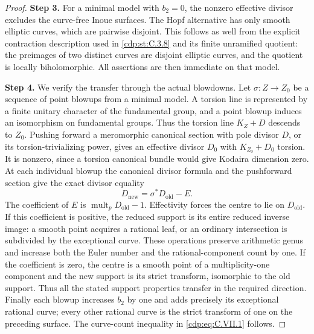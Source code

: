 \begin{proof}
\noindent\textbf{Step 3.} For a minimal model with $b_2=0$, the nonzero effective
divisor excludes the curve-free Inoue surfaces. The
Hopf alternative has only smooth elliptic curves, which
are pairwise disjoint. This follows as well from the
explicit contraction description used in \ref{cdp:st:C.3.8} and its
finite unramified quotient: the preimages of two distinct
curves are disjoint elliptic curves, and the quotient
is locally biholomorphic. All assertions are then
immediate on that model.

\noindent\textbf{Step 4.} We verify the transfer through the actual blowdowns.
Let $\sigma:Z\to Z_0$ be a sequence of point blowups
from a minimal model. A torsion line is represented by
a finite unitary character of the fundamental group,
and a point blowup induces an isomorphism on fundamental
groups. Thus the torsion line $K_Z+D$ descends to $Z_0$.
Pushing forward a meromorphic canonical section with pole
divisor $D$, or its torsion-trivializing power, gives an
effective divisor $D_0$ with $K_{Z_0}+D_0$ torsion.
It is nonzero, since a torsion canonical bundle would
give Kodaira dimension zero. At each individual blowup
the canonical divisor formula and the pushforward section
give the exact divisor equality
\[
 D_{\mathrm{new}}=\sigma^*D_{\mathrm{old}}-E.
\tag{C.VII.2}\label{cdp:eq:C.VII.2}
\]
The coefficient of $E$ is
$\operatorname{mult}_pD_{\mathrm{old}}-1$.
Effectivity forces the centre to lie on $D_{\mathrm{old}}$.
If this coefficient is positive, the reduced support
is its entire reduced inverse image: a smooth point
acquires a rational leaf, or an ordinary intersection
is subdivided by the exceptional curve. These operations
preserve arithmetic genus and increase both the Euler
number and the rational-component count by one.
If the coefficient is zero, the centre is a smooth point
of a multiplicity-one component and the new support is
its strict transform, isomorphic to the old support.
Thus all the stated support properties transfer in the
required direction. Finally each blowup increases $b_2$
by one and adds precisely its exceptional rational
curve; every other rational curve is the strict transform
of one on the preceding surface. The curve-count
inequality in \eqref{cdp:eq:C.VII.1} follows.
\end{proof}







